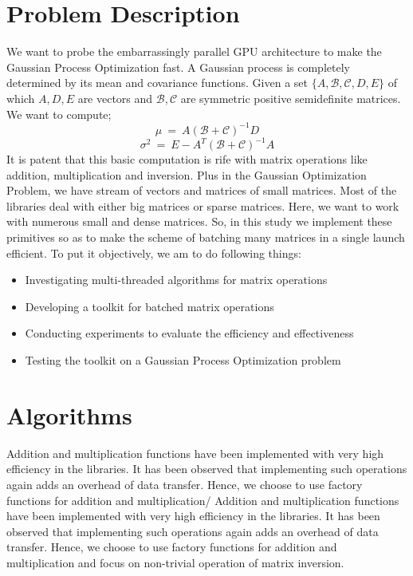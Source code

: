 \documentclass[11pt]{article}
\begin{document}
\section{Problem Description}
We want to probe the embarrassingly parallel GPU architecture to make the Gaussian Process Optimization fast. A Gaussian process is completely determined by its mean and covariance functions. Given a set $\{A, \mathcal{B}, \mathcal{C}, D, E\}$ of which $A, D, E$ are vectors and $\mathcal{B}, \mathcal{C}$ are symmetric positive semidefinite matrices. We want to compute;
\[
	\mu ~=~ A(\mathcal{B} + \mathcal{C})^{-1}D
\]
\[
	\sigma^{2} ~=~ E - A^T(\mathcal{B} + \mathcal{C})^{-1}A
\]
It is patent that this basic computation is rife with matrix operations like addition, multiplication and inversion. Plus in the Gaussian Optimization Problem, we have stream of vectors and matrices of small matrices. Most of the libraries deal with either big matrices or sparse matrices. Here, we want to work with numerous small and dense matrices. So, in this study we implement these primitives so as to make the scheme of batching many matrices in a single launch efficient. To put it objectively, we am to do following things:
\begin{itemize}
	\item Investigating multi-threaded algorithms for matrix operations
	\item Developing a toolkit for batched matrix operations
	\item Conducting experiments to evaluate the efficiency and effectiveness
	\item Testing the toolkit on a Gaussian Process Optimization problem
\end{itemize}

\section{Algorithms}
Addition and multiplication functions have been implemented with very high efficiency in the libraries. It has been observed that implementing such operations again adds an overhead of data transfer. Hence, we choose to use factory functions for addition and multiplication/
Addition and multiplication functions have been implemented with very high efficiency in the libraries. It has been observed that implementing such operations again adds an overhead of data transfer. Hence, we choose to use factory functions for addition and multiplication and focus on non-trivial operation of matrix inversion.
\end{document}
